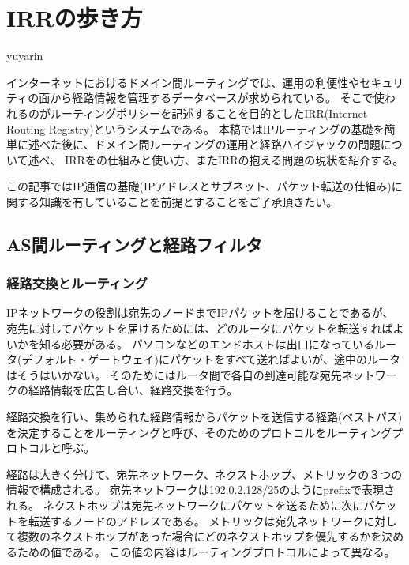 
\chapter{IRRの歩き方}

\begin{flushright}
 {\headfont yuyarin} %
\end{flushright}

インターネットにおけるドメイン間ルーティングでは、運用の利便性やセキュリティの面から経路情報を管理するデータベースが求められている。
そこで使われるのがルーティングポリシーを記述することを目的としたIRR(Internet Routing Registry)というシステムである。
本稿ではIPルーティングの基礎を簡単に述べた後に、ドメイン間ルーティングの運用と経路ハイジャックの問題について述べ、
IRRをの仕組みと使い方、またIRRの抱える問題の現状を紹介する。

この記事ではIP通信の基礎(IPアドレスとサブネット、パケット転送の仕組み)に関する知識を有していることを前提とすることをご了承頂きたい。


\section{AS間ルーティングと経路フィルタ}

\subsection{経路交換とルーティング}

IPネットワークの役割は宛先のノードまでIPパケットを届けることであるが、
宛先に対してパケットを届けるためには、どのルータにパケットを転送すればよいかを知る必要がある。
パソコンなどのエンドホストは出口になっているルータ(デフォルト・ゲートウェイ)にパケットをすべて送ればよいが、途中のルータはそうはいかない。
そのためにはルータ間で各自の到達可能な宛先ネットワークの経路情報を広告し合い、経路交換を行う。

経路交換を行い、集められた経路情報からパケットを送信する経路(ベストパス)を決定することをルーティングと呼び、そのためのプロトコルをルーティングプロトコルと呼ぶ。

経路は大きく分けて、宛先ネットワーク、ネクストホップ、メトリックの３つの情報で構成される。
宛先ネットワークは192.0.2.128/25のようにprefixで表現される。
ネクストホップは宛先ネットワークにパケットを送るために次にパケットを転送するノードのアドレスである。
メトリックは宛先ネットワークに対して複数のネクストホップがあった場合にどのネクストホップを優先するかを決めるための値である。
この値の内容はルーティングプロトコルによって異なる。

